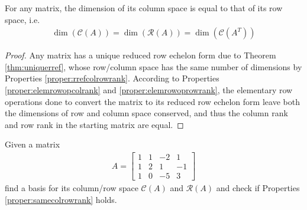 \begin{proper}
\label{proper:samecolrowrank}
For any matrix, the dimension of its column space is equal to that of its row space, i.e.
\begin{align*}
\dim(\mathcal{C}(A)) = \dim(\mathcal{R}(A)) = \dim(\mathcal{C}(A^T))
\end{align*}
\end{proper}
\begin{proof}
Any matrix has a unique reduced row echelon form due to Theorem \ref{thm:uniquerref}, whose row/column space has the same number of dimensions by Properties \ref{proper:rrefcolrowrank}. According to Properties \ref{proper:elemrowopcolrank} and \ref{proper:elemrowoprowrank}, the elementary row operations done to convert the matrix to its reduced row echelon form leave both the dimensions of row and column space conserved, and thus the column rank and row rank in the starting matrix are equal.
\end{proof}
\begin{exmp}
\label{exmp:colrowspace}
Given a matrix
\begin{align*}
A = 
\begin{bmatrix}
1 & 1 & -2 & 1 \\
1 & 2 & 1 & -1 \\
1 & 0 & -5 & 3
\end{bmatrix}
\end{align*}
find a basis for its column/row space $\mathcal{C}(A)$ and $\mathcal{R}(A)$ and check if Properties \ref{proper:samecolrowrank} holds.
\end{exmp}
